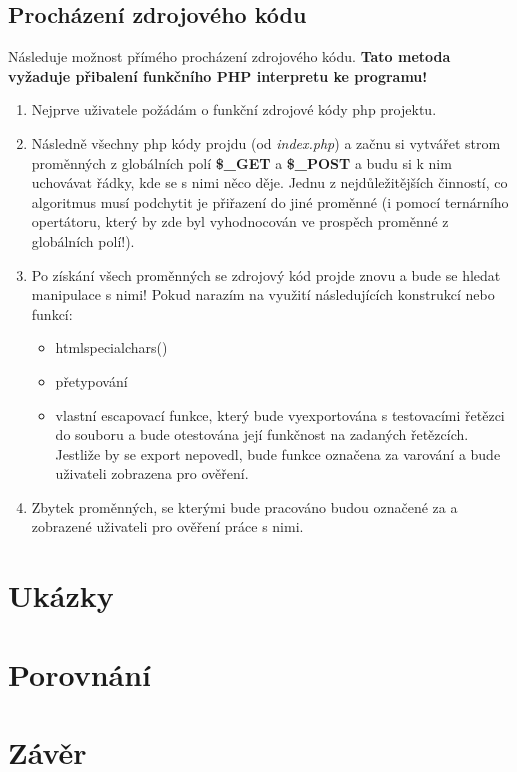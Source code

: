 \documentclass[12pt, a4paper]{report}
\begin{document}
\section{Procházení zdrojového kódu}
Následuje možnost přímého procházení zdrojového kódu. \textbf{Tato metoda vyžaduje přibalení funkčního PHP interpretu ke programu!}
\begin{enumerate}
\item Nejprve uživatele požádám o funkční zdrojové kódy php projektu.
\item Následně všechny php kódy projdu (od \emph{index.php}) a začnu si vytvářet strom proměnných z globálních polí \textbf{\$\_GET} a \textbf{\$\_POST}  a budu si k nim uchovávat řádky, kde se s nimi něco děje. Jednu z nejdůležitějších činností, co algoritmus musí podchytit je přiřazení do jiné proměnné (i pomocí ternárního opertátoru, který by zde byl vyhodnocován ve prospěch proměnné z globálních polí!).
\item Po získání všech proměnných se zdrojový kód projde znovu a bude se hledat manipulace s nimi! Pokud narazím na využití následujících konstrukcí nebo funkcí:
\begin{itemize}
\item htmlspecialchars()
\item přetypování
\item vlastní escapovací funkce, který bude vyexportována s testovacími řetězci do souboru a bude otestována její funkčnost na zadaných řetězcích. Jestliže by se export nepovedl, bude funkce označena za varování a bude uživateli zobrazena pro ověření.
\end{itemize}
\item Zbytek proměnných, se kterými bude pracováno budou označené za  a zobrazené uživateli pro ověření práce s nimi.
\end{enumerate}

\chapter{Ukázky}

\chapter{Porovnání}
\chapter{Závěr}
\end{document}
